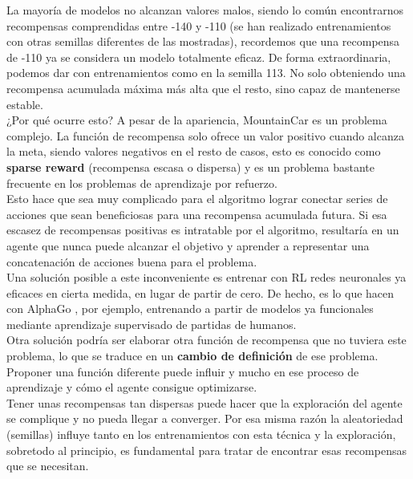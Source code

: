 \documentclass[11pt,fleqn]{book} %
\begin{document}
La mayoría de modelos no alcanzan valores malos, siendo lo común encontrarnos recompensas comprendidas entre -140 y -110 (se han realizado entrenamientos con otras semillas diferentes de las mostradas), recordemos que una recompensa de -110 ya se considera un modelo totalmente eficaz. De forma extraordinaria, podemos dar con entrenamientos como en la semilla 113. No solo obteniendo una recompensa acumulada máxima más alta que el resto, sino capaz de mantenerse estable. \\

¿Por qué ocurre esto? A pesar de la apariencia, MountainCar es un problema complejo. La función de recompensa solo ofrece un valor positivo cuando alcanza la meta, siendo valores negativos en el resto de casos, esto es conocido como \textbf{sparse reward} (recompensa escasa o dispersa) y es un problema bastante frecuente en los problemas de aprendizaje por refuerzo. \cite{article:sparse} \\

Esto hace que sea muy complicado para el algoritmo lograr conectar series de acciones que sean beneficiosas para una recompensa acumulada futura. Si esa escasez de recompensas positivas es intratable por el algoritmo, resultaría en un agente que nunca puede alcanzar el objetivo y aprender a representar una concatenación de acciones buena para el problema. \\

Una solución posible a este inconveniente es entrenar con RL redes neuronales ya eficaces en cierta medida, en lugar de partir de cero. De hecho, es lo que hacen con AlphaGo \cite{book:alphago}, por ejemplo, entrenando a partir de modelos ya funcionales mediante aprendizaje supervisado de partidas de humanos. \\

Otra solución podría ser elaborar otra función de recompensa que no tuviera este problema, lo que se traduce en un \textbf{cambio de definición} de ese problema. Proponer una función diferente puede influir y mucho en ese proceso de aprendizaje y cómo el agente consigue optimizarse. \\

Tener unas recompensas tan dispersas puede hacer que la exploración del agente se complique y no pueda llegar a converger. Por esa misma razón la aleatoriedad (semillas) influye tanto en los entrenamientos con esta técnica y la exploración, sobretodo al principio, es fundamental para tratar de encontrar esas recompensas que se necesitan. \\
\end{document}

